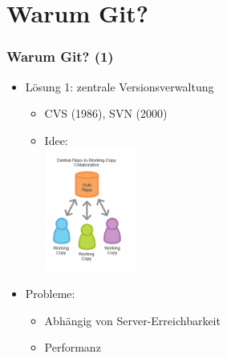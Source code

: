 \documentclass{beamer}
\begin{document}
\section{Warum Git?}
\begin{frame}[label=why20]
\frametitle{Warum Git? (1)}

\begin{itemize}
  \item Lösung 1: zentrale Versionsverwaltung
  \begin{itemize}
   \item CVS (1986), SVN (2000)
   \item Idee:\\[-2mm]
   \hspace{2cm}\includegraphics[width=30mm]{img-src/structure-svn1}
   
  \end{itemize}
  \item Probleme:
  \begin{itemize}
   \item Abhängig von Server-Erreichbarkeit
   \item Performanz
  \end{itemize}

  \end{itemize}
\end{frame}
\end{document}
